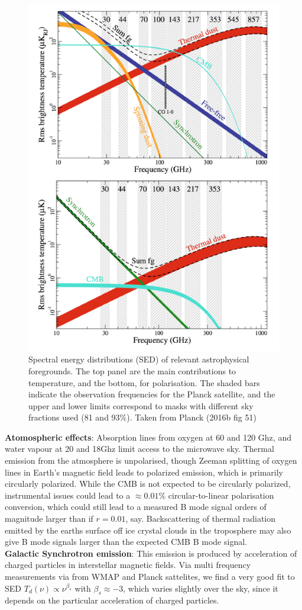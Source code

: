\documentclass[a4paper,10pt]{article}
\begin{document}
\begin{figure}[h]
\includegraphics[width=0.4\linewidth]{foregrounds.png}
\centering
\caption{Spectral energy distributions (SED) of relevant astrophysical foregrounds. The top panel are the main contributions to temperature, and the bottom, for polarisation. The shaded bars indicate the observation frequencies for the Planck satellite, and the upper and lower limits correspond to masks with different sky fractions used (81 and 93\%). Taken from Planck (2016b fig 51) }
\label{foregrounds}
\end{figure}

\textbf{Atomospheric effects}: Absorption lines from oxygen at 60 and 120 Ghz, and water vapour at 20 and 18Ghz limit access to the microwave sky. Thermal emission from the atmosphere is unpolarised, though Zeeman splitting of oxygen lines in Earth's magnetic field leads to polarized emission, which is primarily circularly polarized. While the CMB is not expected to be circularly polarized, instrumental issues could lead to a $\approx 0.01\%$ circular-to-linear polarisation conversion, which could still lead to a measured B mode signal orders of magnitude larger than if $r=0.01$, say. Backscattering of thermal radiation emitted by the earths surface off ice  crystal clouds in the troposphere may also give B mode signals larger than the expected CMB B mode signal. \\

\textbf{Galactic Synchrotron emission}: This emission is produced by acceleration of charged particles in interstellar magnetic fields. Via multi frequency measurements via from WMAP and Planck sattelites, we find a very good fit to SED $T_d(\nu) \propto \nu^{\beta_s}$ with $\beta_s \approx -3$, which varies slightly over the sky, since it depends on the particular acceleration of charged particles.\\
\end{document}
